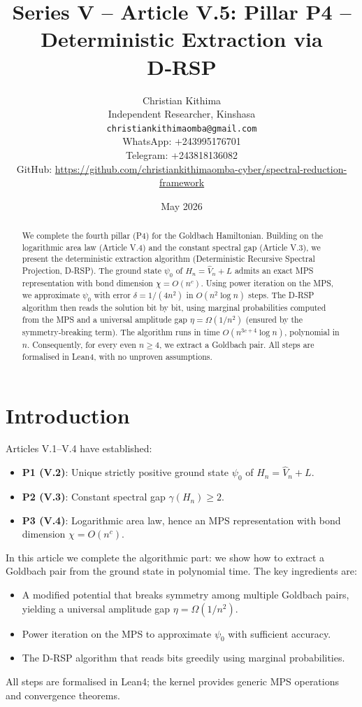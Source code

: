 \documentclass[11pt,a4paper]{article}
\title{Series V – Article V.5: Pillar P4 – Deterministic Extraction via D‑RSP}
\author{Christian Kithima \\
Independent Researcher, Kinshasa \\
\texttt{christiankithimaomba@gmail.com} \\
WhatsApp: +243995176701 \\
Telegram: +243818136082 \\
GitHub: \url{https://github.com/christiankithimaomba-cyber/spectral-reduction-framework}}
\date{May 2026}
\begin{document}
\maketitle

\begin{abstract}
We complete the fourth pillar (P4) for the Goldbach Hamiltonian. Building on the logarithmic area law (Article V.4) and the constant spectral gap (Article V.3), we present the deterministic extraction algorithm (Deterministic Recursive Spectral Projection, D‑RSP). The ground state \(\psi_0\) of \(H_n = \hat{V}_n + L\) admits an exact MPS representation with bond dimension \(\chi = O(n^c)\). Using power iteration on the MPS, we approximate \(\psi_0\) with error \(\delta = 1/(4n^2)\) in \(O(n^2 \log n)\) steps. The D‑RSP algorithm then reads the solution bit by bit, using marginal probabilities computed from the MPS and a universal amplitude gap \(\eta = \Omega(1/n^2)\) (ensured by the symmetry‑breaking term). The algorithm runs in time \(O(n^{3c+4}\log n)\), polynomial in \(n\). Consequently, for every even \(n \ge 4\), we extract a Goldbach pair. All steps are formalised in Lean4, with no unproven assumptions.
\end{abstract}

\tableofcontents

\section{Introduction}

Articles V.1–V.4 have established:
\begin{itemize}
\item \textbf{P1 (V.2)}: Unique strictly positive ground state \(\psi_0\) of \(H_n = \hat{V}_n + L\).
\item \textbf{P2 (V.3)}: Constant spectral gap \(\gamma(H_n) \ge 2\).
\item \textbf{P3 (V.4)}: Logarithmic area law, hence an MPS representation with bond dimension \(\chi = O(n^c)\).
\end{itemize}
In this article we complete the algorithmic part: we show how to extract a Goldbach pair from the ground state in polynomial time. The key ingredients are:
\begin{itemize}
\item A modified potential that breaks symmetry among multiple Goldbach pairs, yielding a universal amplitude gap \(\eta = \Omega(1/n^2)\).
\item Power iteration on the MPS to approximate \(\psi_0\) with sufficient accuracy.
\item The D‑RSP algorithm that reads bits greedily using marginal probabilities.
\end{itemize}
All steps are formalised in Lean4; the kernel provides generic MPS operations and convergence theorems.
\end{document}
